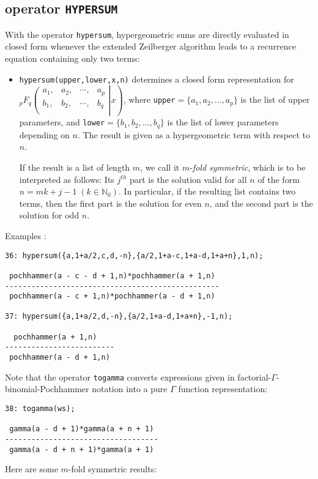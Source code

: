 \subsection{\REDUCE{} operator {\tt HYPERSUM}}

With the operator {\tt hypersum}, hypergeometric sums are directly
evaluated in closed form whenever the extended
Zeilberger algorithm leads to a recurrence equation containing only
two terms:
\begin{itemize}
\item
{\tt hypersum(upper,lower,x,n)} determines a closed form representation
for
$_{p}F_{q}\left.\left(\begin{array}{cccc}
a_{1},&a_{2},&\cdots,&a_{p}\\
b_{1},&b_{2},&\cdots,&b_{q}\\
            \end{array}\right| x\right)
$, where {\tt upper}$=\{a_{1}, a_{2}, \ldots, a_{p}\}$
is the list of upper parameters, and
{\tt lower}$=\{b_{1}, b_{2}, \ldots, b_{q}\}$
is the list of lower parameters depending on $n$. The result is given as a
hypergeometric term with respect to $n$.

If the result is a list of length $m$, we call it $m$-\textsl{fold symmetric},
which is to be interpreted as follows:
Its $j^{th}$ part is the solution valid for all $n$ of the form $n=mk+j-1
\;(k\in\mathbb{N}_0)$.
In particular, if the resulting list contains two terms, then
the first part is the solution for even $n$, and the second part is the
solution for odd $n$.
\end{itemize}
Examples \cite{Koepf:94b}:

{\small
\begin{verbatim}
36: hypersum({a,1+a/2,c,d,-n},{a/2,1+a-c,1+a-d,1+a+n},1,n);

 pochhammer(a - c - d + 1,n)*pochhammer(a + 1,n)
-------------------------------------------------
 pochhammer(a - c + 1,n)*pochhammer(a - d + 1,n)

37: hypersum({a,1+a/2,d,-n},{a/2,1+a-d,1+a+n},-1,n);

  pochhammer(a + 1,n)
-------------------------
 pochhammer(a - d + 1,n)
\end{verbatim}
}\noindent
Note that the operator {\tt togamma} converts expressions given in
factorial-$\Gamma$-binomial-Pochhammer notation
into a pure $\Gamma$ function representation:

{\small
\begin{verbatim}
38: togamma(ws);

 gamma(a - d + 1)*gamma(a + n + 1)
-----------------------------------
 gamma(a - d + n + 1)*gamma(a + 1)
\end{verbatim}
}\noindent
Here are some $m$-fold symmetric results:

